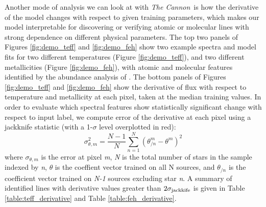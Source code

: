 \documentclass[twocolumn]{aastex62}
\newcommand{\thecannon}{\textsl{The Cannon}}
\begin{document}
Another mode of analysis we can look at with \thecannon\ is how the derivative of the model changes with respect to given training parameters, which makes our model interpretable for discovering or verifying atomic or molecular lines with strong dependence on different physical parameters. The top two panels of Figures \ref{fig:demo_teff} and \ref{fig:demo_feh} show two example spectra and model fits for two different temperatures (Figure \ref{fig:demo_teff}), and two different metallicities (Figure \ref{fig:demo_feh}), with atomic and molecular features identified by the abundance analysis of \citet{Souto:2017}. The bottom panels of Figures \ref{fig:demo_teff} and \ref{fig:demo_feh} show the derivative of flux with respect to temperature and metallicity at each pixel, taken at the median training values. In order to evaluate which spectral features show statistically significant change with respect to input label, we compute error of the derivative at each pixel using a jackknife statistic (with a 1-$\sigma$ level overplotted in red):
\begin{equation}
	\sigma_{\theta,m}^2 = \frac{N-1}{N} \sum^N_{n=1} (\theta_{/n}^m - \theta^m)^2 
\end{equation}
where $\sigma_{\theta,m}$ is the error at pixel \emph{m}, \emph{N} is the total number of stars in the sample indexed by \emph{n}, $\theta$ is the coeffient vector trained on all N sources, and $\theta_{/n}$ is the coefficient vector trained on \emph{N-1} sources excluding star \emph{n}. A summary of identified lines with derivative values greater than $2\sigma_{\rm jackkife}$ is given in Table \ref{table:teff_derivative} and Table \ref{table:feh_derivative}.
\end{document}
